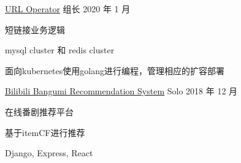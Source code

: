 \begin{cventries}
  \cventry
    {} %
    {\href{https://github.com/tx19980520/url-operator}{URL Operator}} %
    {组长} %
    {2020 年 1 月} %
    {
      \begin{cvitems} %
        \item 短链接业务逻辑
        \item mysql cluster 和 redis cluster
        \item 面向kubernetes使用golang进行编程，管理相应的扩容部署
      \end{cvitems}
    }

  \cventry
    {} %
    {\href{https://github.com/tx19980520/bilibili-demo-back-end}{Bilibili Bangumi Recommendation System}} %
    {Solo} %
    {2018 年 12 月} %
    {
      \begin{cvitems} %
        \item 在线番剧推荐平台
        \item 基于itemCF进行推荐
        \item Django, Express, React
      \end{cvitems}
    }


\end{cventries}
